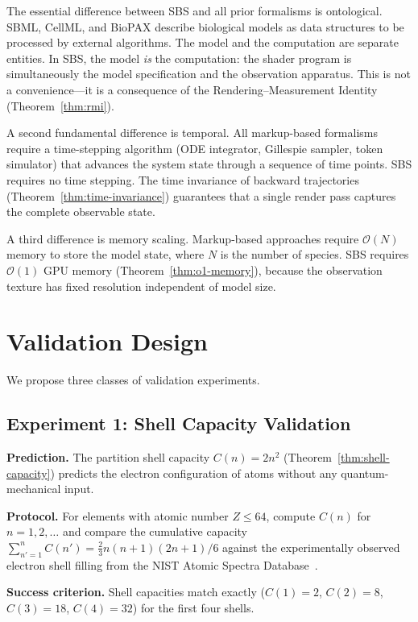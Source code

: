 \documentclass[11pt,twocolumn,a4paper]{article}
\newcommand{\BigO}{\mathcal{O}}
\begin{document}
The essential difference between SBS and all prior formalisms is
ontological.  SBML, CellML, and BioPAX describe biological models as
data structures to be processed by external algorithms.  The model and
the computation are separate entities.  In SBS, the model \emph{is}
the computation: the shader program is simultaneously the model
specification and the observation apparatus.  This is not a
convenience---it is a consequence of the Rendering--Measurement
Identity (Theorem~\ref{thm:rmi}).

A second fundamental difference is temporal.  All markup-based
formalisms require a time-stepping algorithm (ODE integrator,
Gillespie sampler, token simulator) that advances the system state
through a sequence of time points.  SBS requires no time stepping.
The time invariance of backward trajectories
(Theorem~\ref{thm:time-invariance}) guarantees that a single render
pass captures the complete observable state.

A third difference is memory scaling.  Markup-based approaches require
$\BigO(N)$ memory to store the model state, where $N$ is the number of
species.  SBS requires $\BigO(1)$ GPU memory
(Theorem~\ref{thm:o1-memory}), because the observation texture has
fixed resolution independent of model size.


\section{Validation Design}
\label{sec:validation}

We propose three classes of validation experiments.

\subsection{Experiment 1: Shell Capacity Validation}

\textbf{Prediction.}  The partition shell capacity $C(n) = 2n^2$
(Theorem~\ref{thm:shell-capacity}) predicts the electron
configuration of atoms without any quantum-mechanical input.

\textbf{Protocol.}  For elements with atomic number $Z \leq 64$,
compute $C(n)$ for $n = 1, 2, \ldots$ and compare the cumulative
capacity $\sum_{n'=1}^{n} C(n') = \frac{2}{3}n(n+1)(2n+1)/6$ against
the experimentally observed electron shell filling from the NIST
Atomic Spectra Database~\citep{nist_asd}.

\textbf{Success criterion.}  Shell capacities match exactly
($C(1) = 2$, $C(2) = 8$, $C(3) = 18$, $C(4) = 32$) for the first
four shells.
\end{document}
